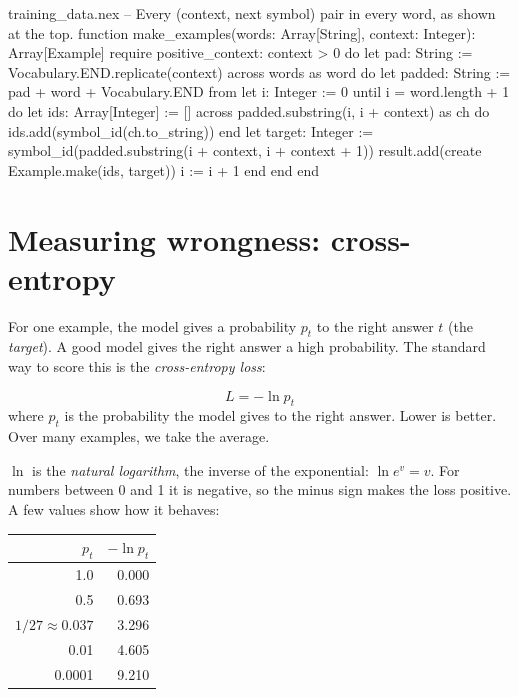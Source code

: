 \documentclass[11pt,a4paper,oneside,openany]{book}
\begin{document}
\begin{append}{training_data.nex}
-- Every (context, next symbol) pair in every word, as shown at the top.
function make_examples(words: Array[String], context: Integer): Array[Example]
require
  positive_context: context > 0
do
  let pad: String := Vocabulary.END.replicate(context)
  across words as word do
    let padded: String := pad + word + Vocabulary.END
    from
      let i: Integer := 0
    until
      i = word.length + 1
    do
      let ids: Array[Integer] := []
      across padded.substring(i, i + context) as ch do
        ids.add(symbol_id(ch.to_string))
      end
      let target: Integer := symbol_id(padded.substring(i + context, i + context + 1))
      result.add(create Example.make(ids, target))
      i := i + 1
    end
  end
end
\end{append}

\section{Measuring wrongness: cross-entropy}

For one example, the model gives a probability $p_t$ to the right answer
$t$ (the \emph{target}). A good model gives the right answer a high
probability. The standard way to score this is the \emph{cross-entropy
loss}:

\begin{mathbox}
\[
  L = -\ln p_t
\]
where $p_t$ is the probability the model gives to the right answer. Lower
is better. Over many examples, we take the average.
\end{mathbox}

$\ln$ is the \emph{natural logarithm}, the inverse of the exponential:
$\ln e^{v} = v$. For numbers between 0 and 1 it is negative, so the minus
sign makes the loss positive. A few values show how it behaves:

\begin{center}
\small
\begin{tabular}{@{}rr@{}}
\toprule
$p_t$ & $-\ln p_t$ \\
\midrule
1.0 & 0.000 \\
0.5 & 0.693 \\
$1/27\approx 0.037$ & 3.296 \\
0.01 & 4.605 \\
0.0001 & 9.210 \\
\bottomrule
\end{tabular}
\end{center}
\end{document}

